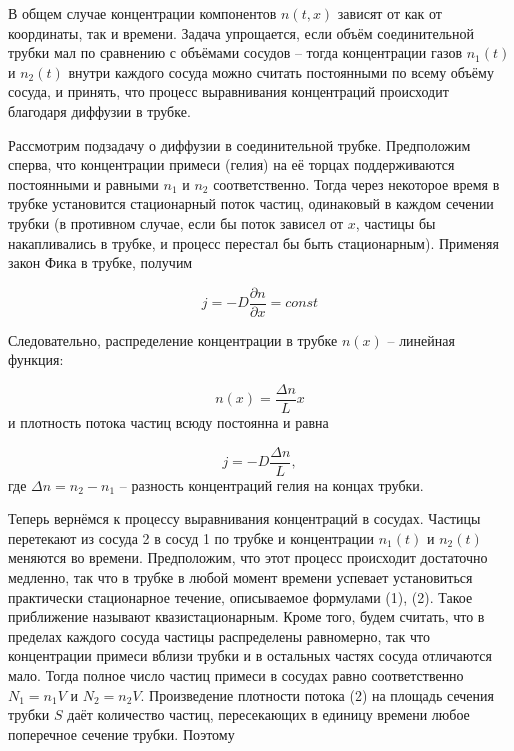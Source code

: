 \documentclass[a4paper,12pt]{article} %
\begin{document}
\medskip

\noindent В общем случае концентрации компонентов $ n(t, x) $ зависят от как от координаты, так и времени. Задача упрощается, если объём соединительной трубки мал по сравнению с объёмами сосудов -- тогда концентрации газов $ n_1(t) $ и $ n_2(t) $ внутри каждого сосуда можно считать постоянными по всему объёму сосуда, и принять, что процесс выравнивания концентраций происходит благодаря диффузии в трубке.

\medskip

\noindent Рассмотрим подзадачу о диффузии в соединительной трубке. Предположим сперва, что концентрации примеси (гелия) на её торцах поддерживаются постоянными и равными $ n_1 $ и $ n_2 $ соответственно. Тогда через некоторое время в трубке установится стационарный поток частиц, одинаковый в каждом сечении трубки (в противном случае, если бы поток зависел от $ x $, частицы бы накапливались в трубке, и процесс перестал бы быть стационарным). Применяя закон Фика в трубке, получим

\[ j=-D\frac{\partial n}{\partial x} = const \]

\noindent Следовательно, распределение концентрации в трубке $ n(x) $ -- линейная
функция:

\begin{equation}\label{3}
n(x) = \frac{\Delta n}{L} x
\end{equation}
и плотность потока частиц всюду постоянна и равна

\begin{equation}\label{4}
j=-D\frac{\Delta n}{L},
\end{equation}
\noindent где $ \Delta n = n_2-n_1 $ -- разность концентраций гелия на концах трубки.

\medskip

\noindent Теперь вернёмся к процессу выравнивания концентраций в сосудах. Частицы перетекают из сосуда 2 в сосуд 1 по трубке и концентрации $ n_1(t) $ и $ n_2(t) $ меняются во времени. Предположим, что этот процесс происходит достаточно медленно, так что в трубке в любой момент времени успевает установиться практически стационарное течение, описываемое формулами (1), (2). Такое приближение называют квазистационарным. Кроме того, будем считать, что в пределах каждого сосуда частицы распределены равномерно, так что концентрации примеси вблизи трубки и в остальных частях сосуда отличаются мало. Тогда полное число частиц примеси в сосудах равно соответственно $ N_1=n_1V $ и $ N_2=n_2V $. Произведение плотности потока (2) на площадь сечения трубки $ S $ даёт количество частиц, пересекающих в единицу времени любое поперечное сечение трубки. Поэтому
\end{document}

